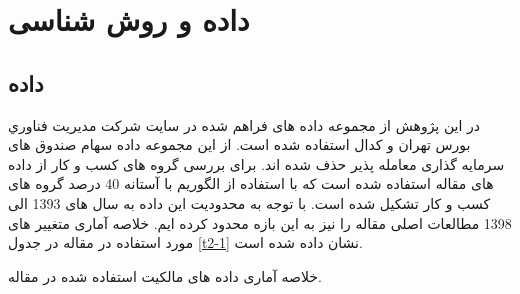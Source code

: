 \section{داده و روش شناسی}



\subsection{داده}
در این پژوهش از مجموعه داده های فراهم شده در سایت شركت مديريت فناوري بورس تهران و کدال استفاده شده است. از این مجموعه داده سهام صندوق های سرمایه گذاری معامله پذیر حذف شده اند. برای بررسی گروه های کسب و کار از داده های مقاله 
	استفاده شده است که با استفاده از الگوریم 
		با آستانه 40 درصد گروه های کسب و کار تشکیل شده است. با توجه به محدودیت این داده به سال های 1393 الی 1398 مطالعات اصلی مقاله را نیز به این بازه محدود کرده ایم. 
		خلاصه آماری متغییر های مورد استفاده در مقاله در جدول 
		\ref{t2-1}
		نشان داده شده است.
			 \begin{table}[htbp]
		        \centering
		        \caption{ خلاصه آماری داده های مالکیت استفاده شده در مقاله.}
		        \label{t2-1}
		        \begin{LTR}
		        		\lr{\resizebox{1\textwidth}{!}
		        {
		        
		         }}
		         		\end{LTR}
		      \end{table}
		
